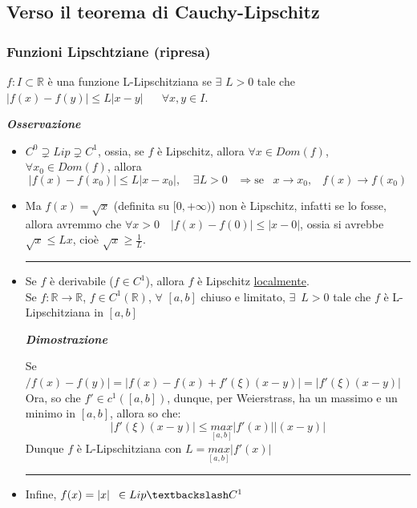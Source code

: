 \documentclass{article}
\theoremstyle{definition}
\newcommand{\linea}{\vspace{15pt}\hrule\vspace{15pt}}
\newcommand{\R}{\mathbb{R}}
\begin{document}
\subsection{Verso il teorema di Cauchy-Lipschitz}
\subsubsection{Funzioni Lipschtziane (ripresa)}
 $f: I \subset \R$ è una funzione L-Lipschitziana se $\exists \,\, L > 0$ tale che $|f(x)-f(y)| \leqslant L|x-y| \,\,\,\,\,\,\,\,\,\, \forall x,y \in I$.
 \begin{center}
     \textbf{\textit{Osservazione}}
 \end{center}
\begin{itemize}
    \item $C^0 \supsetneq Lip \supsetneq C^1$, ossia, se $f$ è Lipschitz, allora $\forall x \in Dom(f)$, $\forall x_0 \in Dom(f)$, allora
    \begin{equation}
        |f(x)-f(x_0)| \leqslant L|x-x_0|, \,\,\,\,\,\ \exists L>0 \,\,\,\,\, \Longrightarrow \mbox{se} \,\,\,\,\, x \to x_0, \,\,\,\,\, f(x) \to f(x_0)
    \end{equation}
    \item Ma $f(x)=\sqrt{x}$ (definita su $[0,+\infty)$) non è Lipschitz, infatti se lo fosse, allora avremmo che $\forall x > 0 \,\,\,\,\,\, |f(x)-f(0)| \leqslant |x-0|$, ossia si avrebbe $\sqrt{x} \leqslant Lx$, cioè $\sqrt{x} \geqslant \frac{1}{L}$.
    \linea
    \item Se $f$ è derivabile  ($f \in C^1$), allora $f$ è Lipschitz \underline{localmente}.
    \\
    Se $f : \R \to \R$, $f \in C^1(\R)$, $\forall \,\,[a,b]$ chiuso e limitato, $\exists \,\,\, L> 0$ tale che $f$ è L-Lipschitziana in $[a,b]$
   
    \begin{center}
        \textbf{\textit{Dimostrazione}}
    \end{center}
    Se $/f(x)-f(y)| = |f(x)-f(x)+f'(\xi)(x-y)|=|f'(\xi)(x-y)|$
    \\
    Ora, so che $f' \in c^1([a,b])$, dunque, per Weierstrass, ha un massimo e un minimo in $[a,b]$, allora so che:
    \begin{equation}
        |f'(\xi)(x-y)|\leqslant \underset{[a,b]}{max}|f'(x)||(x-y)|
    \end{equation}
    Dunque $f$ è L-Lipschitziana con $L=\underset{[a,b]}{max}|f'(x)|$
    \linea
    \item Infine, $f(x)=|x| \,\,\, \in Lip \textbackslash C^1$
\end{itemize}
\end{document}
